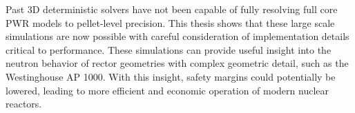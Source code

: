 \documentclass[12pt,twoside]{mitthesis-exec}
\begin{document}
Past 3D deterministic solvers have not been capable of fully resolving full core PWR models to pellet-level precision. This thesis shows that these large scale simulations are now possible with careful consideration of implementation details critical to performance. These simulations can provide useful insight into the neutron behavior of rector geometries with complex geometric detail, such as the Westinghouse AP 1000\texttrademark. With this insight, safety margins could potentially be lowered, leading to more efficient and economic operation of modern nuclear reactors.



\begin{singlespace}


\end{singlespace}
\end{document}
